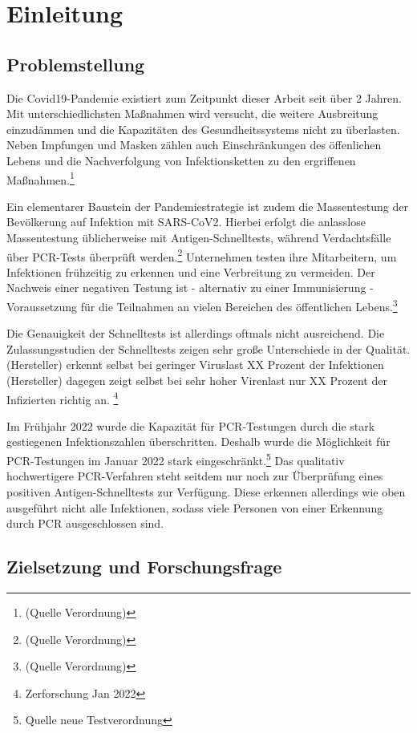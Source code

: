 \chapter{Einleitung}
\section{Problemstellung}
Die Covid19-Pandemie existiert zum Zeitpunkt dieser Arbeit seit über 2 Jahren.
Mit unterschiedlichsten Maßnahmen wird versucht, die weitere Ausbreitung einzudämmen und die Kapazitäten des Gesundheitssystems nicht zu überlasten.
Neben Impfungen und Masken zählen auch Einschränkungen des öffenlichen Lebens und die Nachverfolgung von Infektionsketten zu den ergriffenen Maßnahmen.\footnote{(Quelle Verordnung)}

Ein elementarer Baustein der Pandemiestrategie ist zudem die Massentestung der Bevölkerung auf Infektion mit SARS-CoV2.
Hierbei erfolgt die anlasslose Massentestung üblicherweise mit Antigen-Schnelltests, während Verdachtsfälle über PCR-Tests überprüft werden.\footnote{(Quelle Verordnung)}
Unternehmen testen ihre Mitarbeitern, um Infektionen frühzeitig zu erkennen und eine Verbreitung zu vermeiden.
 Der Nachweis einer negativen Testung ist - alternativ zu einer Immunisierung - Voraussetzung für die Teilnahmen an vielen Bereichen des öffentlichen Lebens.\footnote{(Quelle Verordnung)}

Die Genauigkeit der Schnelltests ist allerdings oftmals nicht ausreichend.
Die Zulassungsstudien der Schnelltests zeigen sehr große Unterschiede in der Qualität.
(Hersteller) erkennt selbst bei geringer Viruslast XX Prozent der Infektionen
(Hersteller) dagegen zeigt selbst bei sehr hoher Virenlast nur XX Prozent der Infizierten richtig an.
\footnote{Zerforschung Jan 2022}

Im Frühjahr 2022 wurde die Kapazität für PCR-Testungen durch die stark gestiegenen Infektionszahlen überschritten.
Deshalb wurde die Möglichkeit für PCR-Testungen im Januar 2022 stark eingeschränkt.\footnote{Quelle neue Testverordnung}
Das qualitativ hochwertigere PCR-Verfahren steht seitdem nur noch zur Überprüfung eines positiven Antigen-Schnelltests zur Verfügung.
Diese erkennen allerdings wie oben ausgeführt nicht alle Infektionen, sodass viele Personen von einer Erkennung durch PCR ausgeschlossen sind.

\section{Zielsetzung und Forschungsfrage}

